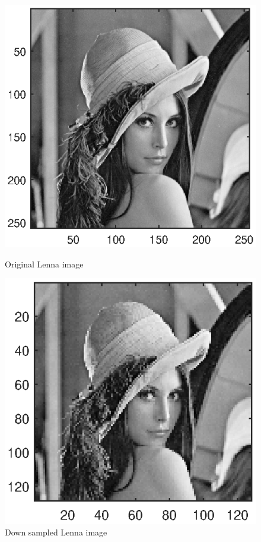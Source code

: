 \documentclass{article}
\begin{document}
\begin{figure}[H]
	\begin{minipage}[t]{0.5\linewidth}
		\centering
		\includegraphics[scale=0.5]{fig6}
		\caption{Original Lenna image}
	\end{minipage}
	\begin{minipage}[t]{0.5\linewidth}
		\centering
		\includegraphics[scale=0.6]{fig7}
		\caption{Down sampled Lenna image}
	\end{minipage}
\end{figure}
\end{document}
